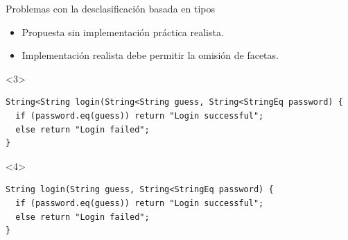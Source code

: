 \documentclass[aspectratio=169,18pt]{beamer}
\begin{document}

\begin{frame}[fragile]{Problemas con la desclasificación basada en tipos}
	\begin{itemize} \pause
		\item Propuesta sin implementación práctica realista. \pause
		\item Implementación realista debe permitir la omisión de facetas. \pause
	\end{itemize}
	\vspace{1cm}
	\begin{onlyenv}
\begin{lstlisting}[basicstyle=\fontsize{10}{10}\ttfamily]
String<String login(String<String guess, String<StringEq password) {
  if (password.eq(guess)) return "Login successful";
  else return "Login failed";
}
\end{lstlisting}

	\end{onlyenv}
	\begin{onlyenv}
\begin{lstlisting}[basicstyle=\fontsize{10}{10}\ttfamily]
String login(String guess, String<StringEq password) {
  if (password.eq(guess)) return "Login successful";
  else return "Login failed";
}
\end{lstlisting}

	\end{onlyenv}
\end{frame}
\end{document}
